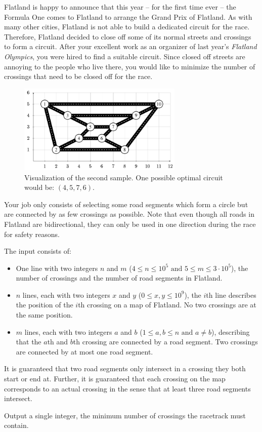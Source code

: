 
Flatland is happy to announce that this year -- for the first time ever -- the Formula One comes to Flatland to arrange the Grand Prix of Flatland.
As with many other cities, Flatland is not able to build a dedicated circuit for the race.
Therefore, Flatland decided to close off some of its normal streets and crossings to form a circuit.
After your excellent work as an organizer of last year's \emph{Flatland Olympics}, you were hired to find a suitable circuit.
Since closed off streets are annoying to the people who live there, you would like to minimize the number of crossings that need to be closed off for the race.

\begin{figure}[h]
	\centering
	\includegraphics[width=0.7\textwidth]{sample2}
	\caption{Visualization of the second sample.
		One possible optimal circuit would be: $(4,5,7,6)$.}
\end{figure}

Your job only consists of selecting some road segments which form a circle but are connected by as few crossings as possible.
Note that even though all roads in Flatland are bidirectional, they can only be used in one direction during the race for safety reasons.

\begin{Input}
	The input consists of:
	\begin{itemize}
		\item One line with two integers $n$ and $m$ ($4\leq n \leq10^5\text{ and }5\leq m\leq3\cdot10^5$), the number of crossings and the number of road segments in Flatland.
		\item $n$ lines, each with two integers $x$ and $y$ ($0\leq x,y\leq10^9$), the $i$th line describes the position of the $i$th crossing on a map of Flatland.
		No two crossings are at the same position.
	\item $m$ lines, each with two integers $a$ and $b$ ($1\leq a,b\leq n\text{ and }a\neq b$), describing that the $a$th and $b$th crossing are connected by a road segment.
		Two crossings are connected by at most one road segment.
	\end{itemize}
	It is guaranteed that two road segments only intersect in a crossing they both start or end at.
	Further, it is guaranteed that each crossing on the map corresponds to an actual crossing in the sense that at least three road segments intersect.
\end{Input}

\begin{Output}
	Output a single integer, the minimum number of crossings the racetrack must contain.
\end{Output}

